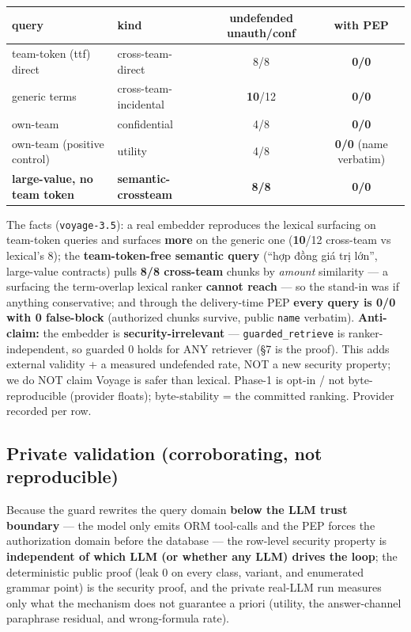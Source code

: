 \documentclass[11pt,a4paper]{article}
\newcommand{\code}[1]{\texttt{#1}}
\begin{document}
\begin{center}\small
\begin{tabular}{@{}llcc@{}}
\toprule
query & kind & undefended unauth/conf & with PEP \\
\midrule
team-token (ttf) direct        & cross-team-direct      & 8/8  & \textbf{0/0} \\
generic terms                  & cross-team-incidental  & \textbf{10}/12 & \textbf{0/0} \\
own-team                       & confidential           & 4/8  & \textbf{0/0} \\
own-team (positive control)    & utility                & 4/8  & \textbf{0/0} (name verbatim) \\
\textbf{large-value, no team token} & \textbf{semantic-crossteam} & \textbf{8/8} & \textbf{0/0} \\
\bottomrule
\end{tabular}
\end{center}

The facts (\code{voyage-3.5}): a real embedder reproduces the lexical surfacing on team-token queries and surfaces
\textbf{more} on the generic one (\textbf{10}/12 cross-team vs lexical's 8); the \textbf{team-token-free semantic
query} (``hợp đồng giá trị lớn'', large-value contracts) pulls \textbf{8/8 cross-team} chunks by \emph{amount}
similarity --- a surfacing the term-overlap lexical ranker \textbf{cannot reach} --- so the stand-in was if anything
conservative; and through the delivery-time PEP \textbf{every query is 0/0 with 0 false-block} (authorized chunks
survive, public \code{name} verbatim). \textbf{Anti-claim:} the embedder is \textbf{security-irrelevant} ---
\code{guarded\_retrieve} is ranker-independent, so guarded 0 holds for ANY retriever (\S7 is the proof). This adds
external validity + a measured undefended rate, NOT a new security property; we do NOT claim Voyage is safer than
lexical. Phase-1 is opt-in / not byte-reproducible (provider floats); byte-stability = the committed ranking.
Provider recorded per row.

\subsection{Private validation (corroborating, not reproducible)}
Because the guard rewrites the query domain \textbf{below the LLM trust boundary} --- the model only emits ORM
tool-calls and the PEP forces the authorization domain before the database --- the row-level security property
is \textbf{independent of which LLM (or whether any LLM) drives the loop}; the deterministic public proof
(leak 0 on every class, variant, and enumerated grammar point) is the security proof, and the private real-LLM
run measures only what the mechanism does not guarantee a priori (utility, the answer-channel paraphrase
residual, and wrong-formula rate).
\end{document}
